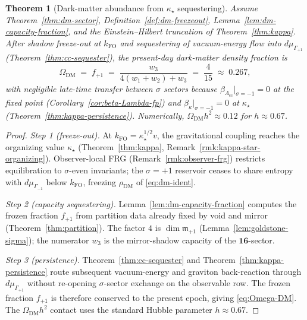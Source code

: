 \documentclass[11pt]{article}
\theoremstyle{plain}
\newtheorem{theorem}{Theorem}[section]
\theoremstyle{definition}
\theoremstyle{remark}
\numberwithin{equation}{section}
\begin{document}
\begin{theorem}[Dark-matter abundance from $\kappa_\star$ sequestering]
\label{thm:dm-abundance}
Assume Theorem~\ref{thm:dm-sector}, Definition~\ref{def:dm-freezeout},
Lemma~\ref{lem:dm-capacity-fraction}, and the Einstein--Hilbert truncation of
Theorem~\ref{thm:kappa}. After shadow freeze-out at $k_{\mathrm{FO}}$ and
sequestering of vacuum-energy flow into $d\mu_{\Gamma_{+1}}$
(Theorem~\ref{thm:cc-sequester}), the present-day dark-matter density fraction
is
\begin{equation}\label{eq:Omega-DM}
  \Omega_{\mathrm{DM}}
  \;=\;
  f_{+1}
  \;=\;
  \frac{w_3}{4(w_1+w_2)+w_3}
  \;=\;
  \frac{4}{15}
  \;\approx\;
  0.267,
\end{equation}
with negligible late-time transfer between $\sigma$ sectors because
$\beta_{\Lambda_{\mathrm{cc}}}|_{\sigma=-1}=0$ at the fixed point
(Corollary~\ref{cor:beta-Lambda-fp}) and $\beta_\kappa|_{\sigma=-1}=0$ at
$\kappa_\star$ (Theorem~\ref{thm:kappa-persistence}). Numerically,
$\Omega_{\mathrm{DM}}h^2\approx 0.12$ for $h\approx 0.67$.
\end{theorem}

\begin{proof}
\emph{Step 1 (freeze-out).}
At $k_{\mathrm{FO}}=\kappa_\star^{1/2}v$, the gravitational coupling reaches
the organizing value $\kappa_\star$ (Theorem~\ref{thm:kappa},
Remark~\ref{rmk:kappa-star-organizing}). Observer-local FRG
(Remark~\ref{rmk:observer-frg}) restricts equilibration to
$\sigma$-even invariants; the $\sigma=+1$ reservoir ceases to share entropy
with $d\mu_{\Gamma_{-1}}$ below $k_{\mathrm{FO}}$, freezing
$\rho_{\mathrm{DM}}$ of \eqref{eq:dm-ident}.

\emph{Step 2 (capacity sequestering).}
Lemma~\ref{lem:dm-capacity-fraction} computes the frozen fraction $f_{+1}$
from partition data already fixed by void and mirror
(Theorem~\ref{thm:partition}). The factor $4$ is $\dim\mathfrak{m}_{+1}$
(Lemma~\ref{lem:goldstone-sigma}); the numerator $w_3$ is the mirror-shadow
capacity of the $\mathbf{16}$-sector.

\emph{Step 3 (persistence).}
Theorem~\ref{thm:cc-sequester} and Theorem~\ref{thm:kappa-persistence} route
subsequent vacuum-energy and graviton back-reaction through
$d\mu_{\Gamma_{+1}}$ without re-opening $\sigma$-sector exchange on the
observable row. The frozen fraction $f_{+1}$ is therefore conserved to the
present epoch, giving \eqref{eq:Omega-DM}. The $\Omega_{\mathrm{DM}}h^2$
contact uses the standard Hubble parameter $h\approx 0.67$.
\end{proof}
\end{document}
